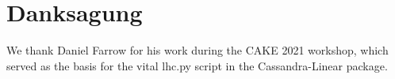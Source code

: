 

\chapter*{Danksagung}

We thank Daniel Farrow for his work during the CAKE 2021 workshop, which
served as the basis for the vital lhc.py script in the Cassandra-Linear
package.
